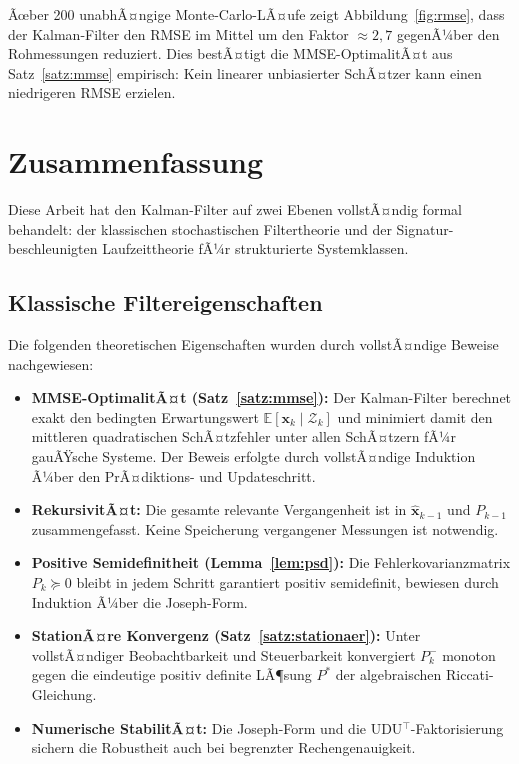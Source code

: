 ﻿\documentclass[a4paper,12pt]{article}
\theoremstyle{definition}
\begin{document}
Ãœber 200 unabhÃ¤ngige Monte-Carlo-LÃ¤ufe zeigt Abbildung~\ref{fig:rmse}, dass der
Kalman-Filter den RMSE im Mittel um den Faktor $\approx 2{,}7$ gegenÃ¼ber den
Rohmessungen reduziert. Dies bestÃ¤tigt die MMSE-OptimalitÃ¤t aus Satz~\ref{satz:mmse}
empirisch: Kein linearer unbiasierter SchÃ¤tzer kann einen niedrigeren RMSE erzielen.

\section{Zusammenfassung}

Diese Arbeit hat den Kalman-Filter auf zwei Ebenen vollstÃ¤ndig formal behandelt:
der klassischen stochastischen Filtertheorie und der Signatur-beschleunigten
Laufzeittheorie fÃ¼r strukturierte Systemklassen.

\subsection{Klassische Filtereigenschaften}

Die folgenden theoretischen Eigenschaften wurden durch vollstÃ¤ndige Beweise nachgewiesen:

\begin{itemize}
    \item \textbf{MMSE-OptimalitÃ¤t (Satz~\ref{satz:mmse}):} Der Kalman-Filter berechnet
          exakt den bedingten Erwartungswert $\mathbb{E}[\mathbf{x}_k \mid \mathcal{Z}_k]$
          und minimiert damit den mittleren quadratischen SchÃ¤tzfehler unter allen
          SchÃ¤tzern fÃ¼r gauÃŸsche Systeme. Der Beweis erfolgte durch vollstÃ¤ndige
          Induktion Ã¼ber den PrÃ¤diktions- und Updateschritt.
    \item \textbf{RekursivitÃ¤t:} Die gesamte relevante Vergangenheit ist in
          $\hat{\mathbf{x}}_{k-1}$ und $P_{k-1}$ zusammengefasst. Keine Speicherung
          vergangener Messungen ist notwendig.
    \item \textbf{Positive Semidefinitheit (Lemma~\ref{lem:psd}):} Die Fehlerkovarianzmatrix
          $P_k \succeq 0$ bleibt in jedem Schritt garantiert positiv semidefinit,
          bewiesen durch Induktion Ã¼ber die Joseph-Form.
    \item \textbf{StationÃ¤re Konvergenz (Satz~\ref{satz:stationaer}):} Unter vollstÃ¤ndiger
          Beobachtbarkeit und Steuerbarkeit konvergiert $P_k^-$ monoton gegen die
          eindeutige positiv definite LÃ¶sung $P^*$ der algebraischen Riccati-Gleichung.
    \item \textbf{Numerische StabilitÃ¤t:} Die Joseph-Form und die UDU$^\top$-Faktorisierung
          sichern die Robustheit auch bei begrenzter Rechengenauigkeit.
\end{itemize}
\end{document}
